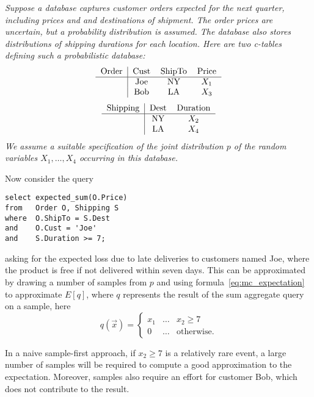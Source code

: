 \begin{example}\em
\label{ex:intro}
Suppose a database captures customer orders expected for the next quarter,
including prices and
and destinations of shipment. The order prices are 
uncertain, but a probability distribution is assumed.
The database also stores
distributions of shipping durations for each location.
Here are two c-tables defining such a probabilistic database:
\[
\begin{tabular}{c|ccc}
Order & Cust & ShipTo & Price \\
\hline
& Joe & NY & $X_1$ \\
& Bob & LA & $X_3$ \\
\end{tabular}
\]\[
\begin{tabular}{c|cc}
Shipping & Dest & Duration \\
\hline
& NY & $X_2$ \\
& LA & $X_4$ \\
\end{tabular}
\]
We assume a suitable specification of the joint distribution $p$ of the random
variables $X_1,\dots,X_4$ occurring in this database.

Now consider the query
\begin{verbatim}
select expected_sum(O.Price)
from   Order O, Shipping S
where  O.ShipTo = S.Dest
and    O.Cust = 'Joe'
and    S.Duration >= 7;
\end{verbatim}
asking for the expected loss due to late deliveries to customers named Joe,
where the product is free if not delivered within seven days.
%
This can be approximated by drawing a number of samples from $p$
and using formula~\ref{eq:mc_expectation}
to approximate $E[q]$,
where $q$ represents the result of the sum aggregate query on a sample,
here
\[
q(\vec{x}) =
\left\{
\begin{array}{lll}
x_1 & \dots & x_2 \ge 7 \\
0 & \dots & \mbox{otherwise.}
\end{array}
\right.
\]

In a naive sample-first approach, 
if $x_2 \ge 7$ is a relatively rare event, a large number of samples will be
required to compute a good approximation to the expectation.
Moreover, samples also require an effort for customer Bob,
which does not contribute to the result.


\end{example}
